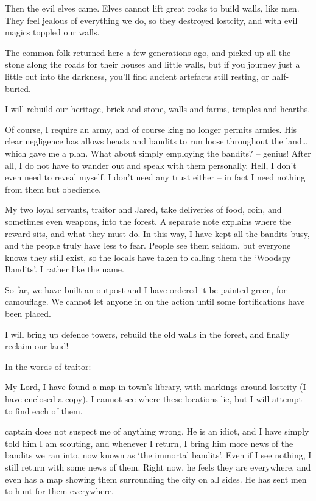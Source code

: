 \begin{multicols}{2}
\begin{exampletext}
  Then the evil elves came.
  Elves cannot lift great rocks to build walls, like men.
  They feel jealous of everything we do, so they destroyed \gls{lostcity}, and with evil magics toppled our walls.

  The common folk returned here a few generations ago, and picked up all the stone along the roads for their houses and little walls, but if you journey just a little out into the darkness, you'll find ancient artefacts still resting, or half-buried.

  I will rebuild our heritage, brick and stone, walls and farms, temples and hearths.

  Of course, I require an army, and of course \gls{king} no longer permits armies.
  His clear negligence has allows beasts and bandits to run loose throughout the land\ldots which gave me a plan.
  What about simply employing the bandits? -- genius!
  After all, I do not have to wander out and speak with them personally.
  Hell, I don't even need to reveal myself.
  I don't need any trust either -- in fact I need nothing from them but obedience.

  My two loyal servants, \gls{traitor} and Jared, take deliveries of food, coin, and sometimes even weapons, into the forest.
  A separate note explains where the reward sits, and what they must do.
  In this way, I have kept all the bandits busy, and the people truly have less to fear.
  People see them seldom, but everyone knows they still exist, so the locals have taken to calling them the `Woodspy Bandits'.
  I rather like the name.

  So far, we have built an outpost and I have ordered it be painted green, for camouflage.
  We cannot let anyone in on the action until some fortifications have been placed.
  
  I will bring up defence towers, rebuild the old walls in the forest, and finally reclaim our land!

\end{exampletext}

In the words of \gls{traitor}:

\begin{exampletext}

  My Lord,
  I have found a map in \gls{town}'s library, with markings around \gls{lostcity} (I have enclosed a copy).
  I cannot see where these locations lie, but I will attempt to find each of them.

  \Gls{captain} does not suspect me of anything wrong.
  He is an idiot, and I have simply told him I am scouting, and whenever I return, I bring him more news of the bandits we ran into, now known as `the immortal bandits'.
  Even if I see nothing, I still return with some news of them.
  Right now, he feels they are everywhere, and even has a map showing them surrounding the city on all sides.
  He has sent men to hunt for them everywhere.


\end{exampletext}
\end{multicols}
